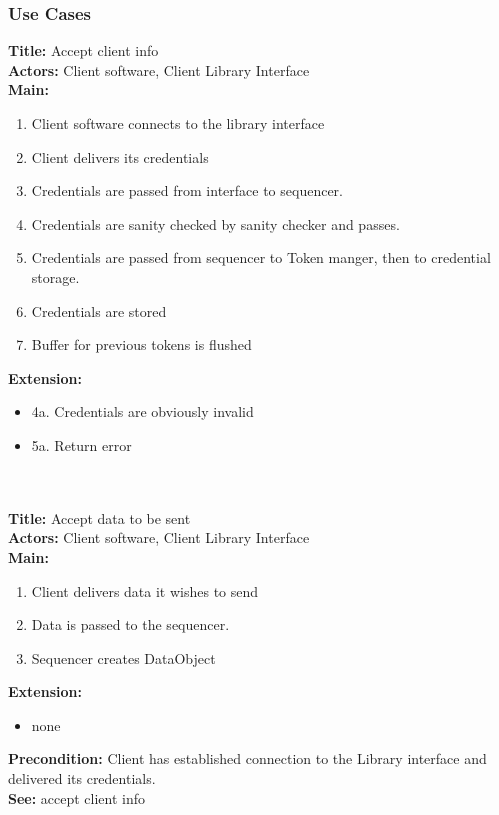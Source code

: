 	\subsubsection{Use Cases}\label{client use cases}
		\textbf{Title:} Accept client info \\
		\textbf{Actors:} Client software, Client Library Interface \\
		\textbf{Main:}
		\begin{enumerate}
			\item Client software connects to the library interface
			\item Client delivers its credentials
			\item Credentials are passed from interface to sequencer.
			\item Credentials are sanity checked by sanity checker and passes.
			\item Credentials are passed from sequencer to Token manger, then to credential storage.
			\item Credentials are stored
			\item Buffer for previous tokens is flushed
		\end{enumerate}
		\textbf{Extension:} 
		\begin{itemize}
			  \item[] 4a. Credentials are obviously invalid
			  \item[] 5a. Return error
		\end{itemize}
		\\\\
		\textbf{Title:} Accept data to be sent \\
		\textbf{Actors:} Client software, Client Library Interface \\
		\textbf{Main:}
		\begin{enumerate}
			\item Client delivers data it wishes to send
			\item Data is passed to the sequencer.
			\item Sequencer creates DataObject
		\end{enumerate}
		\textbf{Extension:}
		\begin{itemize}
			 \item[] none
		\end{itemize}
		\textbf{Precondition:} Client has established connection to the Library interface and delivered its credentials. \\
		\textbf{See:} accept client info
		\\\\
